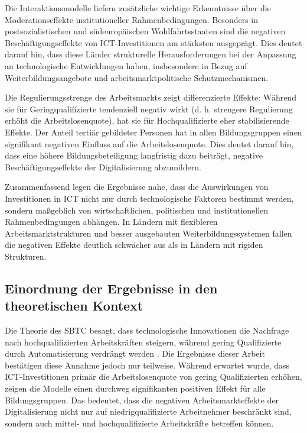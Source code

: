 Die Interaktionsmodelle liefern zusätzliche wichtige Erkenntnisse über die Moderationseffekte 
institutioneller Rahmenbedingungen. Besonders in postsozialistischen und südeuropäischen 
Wohlfahrtsstaaten sind die negativen Beschäftigungseffekte von \ac{ICT}-Investitionen am 
stärksten ausgeprägt. Dies deutet darauf hin, dass diese Länder strukturelle Herausforderungen 
bei der Anpassung an technologische Entwicklungen haben, insbesondere in Bezug auf 
Weiterbildungsangebote und arbeitsmarktpolitische Schutzmechanismen.

Die Regulierungsstrenge des Arbeitsmarkts zeigt differenzierte Effekte: Während sie für 
Geringqualifizierte tendenziell negativ wirkt (d. h. strengere Regulierung erhöht die 
Arbeitslosenquote), hat sie für Hochqualifizierte eher stabilisierende Effekte. Der 
Anteil tertiär gebildeter Personen hat in allen Bildungsgruppen einen signifikant 
negativen Einfluss auf die Arbeitslosenquote. Dies deutet darauf hin, dass eine höhere 
Bildungsbeteiligung langfristig dazu beiträgt, negative Beschäftigungseffekte der Digitalisierung 
abzumildern.

Zusammenfassend legen die Ergebnisse nahe, dass die Auswirkungen von Investitionen in \ac{ICT}  
nicht nur durch technologische Faktoren bestimmt werden, sondern maßgeblich von 
wirtschaftlichen, politischen und institutionellen Rahmenbedingungen abhängen. In Ländern 
mit flexibleren Arbeitsmarktstrukturen und besser ausgebauten Weiterbildungssystemen fallen 
die negativen Effekte deutlich schwächer aus als in Ländern mit rigiden Strukturen.

\subsection{Einordnung der Ergebnisse in den theoretischen Kontext}

Die Theorie des \ac{SBTC} besagt, dass technologische Innovationen die Nachfrage nach 
hochqualifizierten Arbeitskräften steigern, während gering Qualifizierte durch 
Automatisierung verdrängt werden \parencite[vgl.][S. 7]{acemoglu2002technical}. Die Ergebnisse 
dieser Arbeit bestätigen diese Annahme jedoch nur teilweise. Während erwartet wurde, dass 
\ac{ICT}-Investitionen primär die Arbeitslosenquote von gering Qualifizierten erhöhen, 
zeigen die Modelle einen durchweg signifikanten positiven Effekt für alle Bildungsgruppen. 
Das bedeutet, dass die negativen Arbeitsmarkteffekte der Digitalisierung nicht nur auf 
niedrigqualifizierte Arbeitnehmer beschränkt sind, sondern auch mittel- und hochqualifizierte 
Arbeitskräfte betreffen können.


